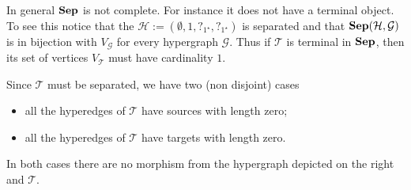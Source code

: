 \documentclass[3p]{elsarticle}
\newcommand{\catname}[1]{\textbf{\textup{#1}}}
\newcommand{\shyp}{\catname{Sep}}
\theoremstyle{remark}
\theoremstyle{definition}
\begin{document}
\begin{exa}\label{ex:noterm}
In general $\shyp$ is not complete. For instance it does not have a terminal object. To see this notice that the $\mathcal{H}:=(\emptyset, 1, ?_{1^\star}, ?_{1^\star} )$ is separated and that 
$\shyp(\mathcal{H}, \mathcal{G})$ is in bijection with $V_{\mathcal{G}}$ for every hypergraph $\mathcal{G}$. Thus if  $\mathcal{T}$ is terminal in $\shyp$, then its set of vertices $V_{\mathcal{T}}$ must have cardinality $1$. 

\smallskip
Since $\mathcal{T}$ must be separated, we have two (non disjoint) cases

\medskip
\begin{minipage}[l]{.65\linewidth}
	\begin{itemize}
		\item  all the hyperedges of $\mathcal{T}$ have sources with length zero; 
		\item all the hyperedges of $\mathcal{T}$ have targets with length zero.
	\end{itemize}
\end{minipage}
\begin{minipage}[r]{.15\linewidth}
\vspace{-.5cm}
\end{minipage}

\medskip
In both cases there are no morphism from the hypergraph depicted on the right and $\mathcal{T}$.
\end{exa}
\end{document}
